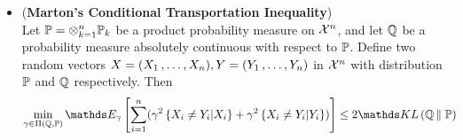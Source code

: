 \documentclass[11pt]{article}
\begin{document}
\begin{itemize}
\begin{proof}
We want to prove the concentration using transportation cost inequality. That is, to bound the term
\begin{align*}
\min_{\gamma \in \Pi(\bQ, \bP)}\sum_{i=1}^{n}(\E{\gamma}{\ind{X_i \neq Y_i}})^2 = \min_{\gamma \in \Pi(\bQ, \bP)}\sum_{i=1}^{n}\gamma^2\set{X_i \neq Y_i}.
\end{align*} We have shown that 
\begin{align*}
\min_{\gamma \in \Pi(\bQ, \bP)}\gamma\set{X \neq Y} = \cW_{1, d_H}(\bQ, \bP) = \sup_{A \in \cX}\abs{\bQ(A) - \bP(A)}  \equiv \norm{\bQ - \bP}{TV}.
\end{align*}  For each independent variable $X_i, Y_i$, and their marginal distribution $\bP_i, \bQ_i$ where $\bQ_i \ll \bP_i$, by Pinsker's inequality,
\begin{align*}
 \min_{\gamma \in \Pi(\bQ_i, \bP_i)}\gamma\set{X_i \neq Y_i}  &\le \sqrt{\frac{1}{2}\kl{\bQ_i}{\bP_i}} \\
\min_{\gamma \in \Pi(\bQ, \bP)} \gamma^2\set{X_i \neq Y_i} &\le \brac{\min_{\gamma \in \Pi(\bQ, \bP)}\gamma\set{X_i \neq Y_i}}^2 \le \frac{1}{2}\kl{\bQ_i}{\bP_i}
\end{align*} Thus by induction lemma, 
\begin{align*}
\min_{\gamma \in \Pi(\bQ, \bP)}\sum_{i=1}^{n}\gamma^2\set{X_i \neq Y_i} &\le \frac{1}{2}\kl{\bQ}{\bP}
\end{align*} which is the \emph{Marton's transportation inequality}. Finally, we have
\begin{align*}
\E{\bQ}{f(Y)} - \E{\bP}{f(X)} &\le \paren{\sum_{i=1}^{n}L_i^2}^{1/2}\paren{\sum_{i=1}^{n}(\E{\gamma}{\ind{X_i \neq Y_i}})^2}^{1/2} \\
&\le \sqrt{\frac{\paren{\sum_{i=1}^{n}L_i^2}}{2}\kl{\bQ}{\bP}}.
\end{align*} Then we can apply the transportation lemma with $\nu := \frac{1}{4}\sum_{i=1}^{n}L_i^2$, which proves the bounded difference inequality. \qed 
\end{proof}

\item \begin{theorem} (\textbf{Marton's Conditional Transportation Inequality}) \citep{boucheron2013concentration}\\
Let ${\mathbb P} = \otimes_{k=1}^n {\mathbb P}_k$ be a product probability measure on ${\mathcal X}^n$, and let ${\mathbb Q}$ be a probability measure absolutely continuous with respect to ${\mathbb P}$. Define two random vectors $X = (X_1 \,{,}\ldots{,}\, X_n), Y = (Y_1 \,{,}\ldots{,}\, Y_n)$ in ${\mathcal X}^n$ with distribution ${\mathbb P}$ and ${\mathbb Q}$ respectively.  Then
\begin{align}
 \min_{\gamma \in \Pi(\bQ, \bP)}\E{\gamma}{\sum_{i=1}^n(\gamma^2\set{X_i \neq Y_i | X_i} + \gamma^2\set{X_i \neq Y_i | Y_i})} &\le 2\kl{\bQ}{\bP} \label{ineqn: marton_conditional_transport_cost_inequality}
\end{align}
\end{theorem}


\end{itemize}
\end{document}
